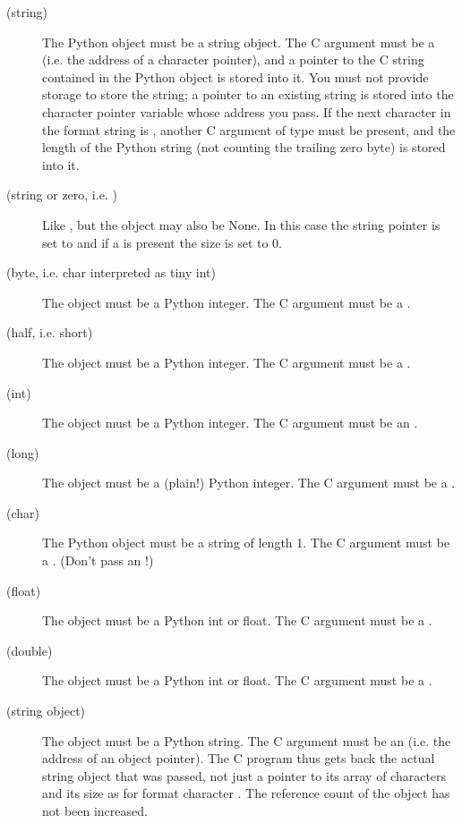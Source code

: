 \begin{description}

\item[ (string)]
The Python object must be a string object.  The C argument must be a
 (i.e. the address of a character pointer), and a pointer
to the C string contained in the Python object is stored into it.  You
must not provide storage to store the string; a pointer to an existing
string is stored into the character pointer variable whose address you
pass.  If the next character in the format string is \samp{\#},
another C argument of type  must be present, and the
length of the Python string (not counting the trailing zero byte) is
stored into it.

\item[ (string or zero, i.e. )]
Like , but the object may also be None.  In this case the
string pointer is set to  and if a \samp{\#} is present the
size is set to 0.

\item[ (byte, i.e. char interpreted as tiny int)]
The object must be a Python integer.  The C argument must be a
.

\item[ (half, i.e. short)]
The object must be a Python integer.  The C argument must be a
.

\item[ (int)]
The object must be a Python integer.  The C argument must be an
.

\item[ (long)]
The object must be a (plain!) Python integer.  The C argument must be
a .

\item[ (char)]
The Python object must be a string of length 1.  The C argument must
be a .  (Don't pass an !)

\item[ (float)]
The object must be a Python int or float.  The C argument must be a
.

\item[ (double)]
The object must be a Python int or float.  The C argument must be a
.

\item[ (string object)]
The object must be a Python string.  The C argument must be an
 (i.e. the address of an object pointer).  The C
program thus gets back the actual string object that was passed, not
just a pointer to its array of characters and its size as for format
character .  The reference count of the object has not been
increased.


\end{description}
